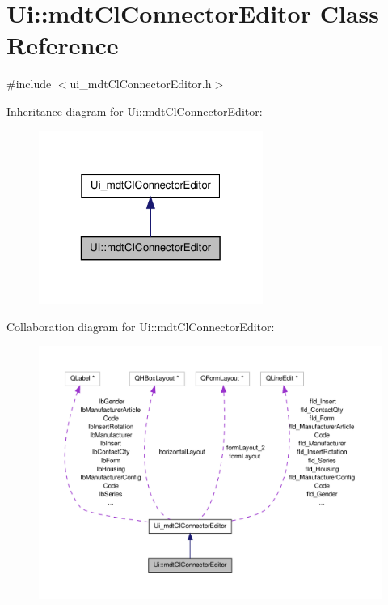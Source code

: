 \hypertarget{class_ui_1_1mdt_cl_connector_editor}{\section{Ui\-:\-:mdt\-Cl\-Connector\-Editor Class Reference}
\label{class_ui_1_1mdt_cl_connector_editor}
}


{\ttfamily \#include $<$ui\-\_\-mdt\-Cl\-Connector\-Editor.\-h$>$}



Inheritance diagram for Ui\-:\-:mdt\-Cl\-Connector\-Editor\-:
\nopagebreak
\begin{figure}[H]
\begin{center}
\leavevmode
\includegraphics[width=208pt]{class_ui_1_1mdt_cl_connector_editor__inherit__graph}
\end{center}
\end{figure}


Collaboration diagram for Ui\-:\-:mdt\-Cl\-Connector\-Editor\-:
\nopagebreak
\begin{figure}[H]
\begin{center}
\leavevmode
\includegraphics[width=350pt]{class_ui_1_1mdt_cl_connector_editor__coll__graph}
\end{center}
\end{figure}
